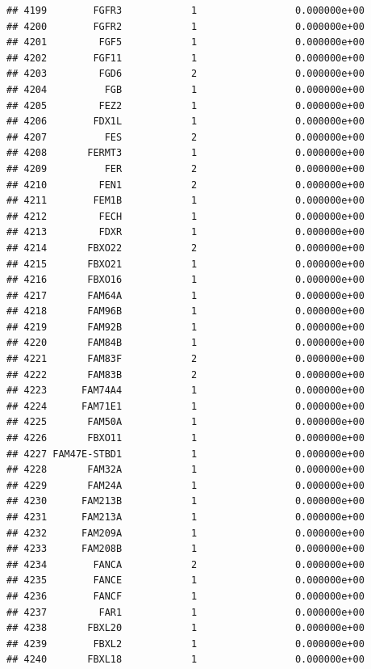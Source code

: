 \documentclass[
]{article}
\begin{document}
\begin{verbatim}
## 4199        FGFR3            1                 0.000000e+00
## 4200        FGFR2            1                 0.000000e+00
## 4201         FGF5            1                 0.000000e+00
## 4202        FGF11            1                 0.000000e+00
## 4203         FGD6            2                 0.000000e+00
## 4204          FGB            1                 0.000000e+00
## 4205         FEZ2            1                 0.000000e+00
## 4206        FDX1L            1                 0.000000e+00
## 4207          FES            2                 0.000000e+00
## 4208       FERMT3            1                 0.000000e+00
## 4209          FER            2                 0.000000e+00
## 4210         FEN1            2                 0.000000e+00
## 4211        FEM1B            1                 0.000000e+00
## 4212         FECH            1                 0.000000e+00
## 4213         FDXR            1                 0.000000e+00
## 4214       FBXO22            2                 0.000000e+00
## 4215       FBXO21            1                 0.000000e+00
## 4216       FBXO16            1                 0.000000e+00
## 4217       FAM64A            1                 0.000000e+00
## 4218       FAM96B            1                 0.000000e+00
## 4219       FAM92B            1                 0.000000e+00
## 4220       FAM84B            1                 0.000000e+00
## 4221       FAM83F            2                 0.000000e+00
## 4222       FAM83B            2                 0.000000e+00
## 4223      FAM74A4            1                 0.000000e+00
## 4224      FAM71E1            1                 0.000000e+00
## 4225       FAM50A            1                 0.000000e+00
## 4226       FBXO11            1                 0.000000e+00
## 4227 FAM47E-STBD1            1                 0.000000e+00
## 4228       FAM32A            1                 0.000000e+00
## 4229       FAM24A            1                 0.000000e+00
## 4230      FAM213B            1                 0.000000e+00
## 4231      FAM213A            1                 0.000000e+00
## 4232      FAM209A            1                 0.000000e+00
## 4233      FAM208B            1                 0.000000e+00
## 4234        FANCA            2                 0.000000e+00
## 4235        FANCE            1                 0.000000e+00
## 4236        FANCF            1                 0.000000e+00
## 4237         FAR1            1                 0.000000e+00
## 4238       FBXL20            1                 0.000000e+00
## 4239        FBXL2            1                 0.000000e+00
## 4240       FBXL18            1                 0.000000e+00

\end{verbatim}
\end{document}
